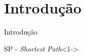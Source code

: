 \section{Introdução}

\begin{frame}{Introdução}
  \begin{block}{SP - \em{Shortest Path}}<1->
  \end{block}
\end{frame}
